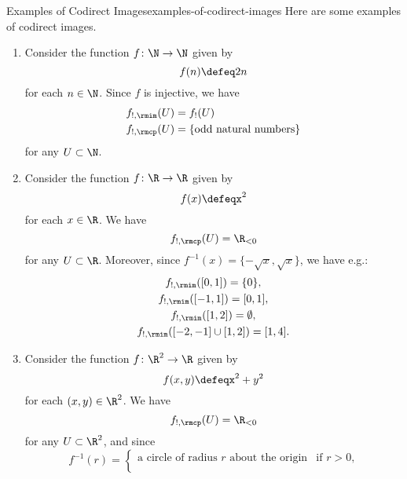 \begin{example}{Examples of Codirect Images}{examples-of-codirect-images}%
    Here are some examples of codirect images.
    \begin{enumerate}
        \item\label{examples-of-codirect-images-multiplication-by-two}Consider the function $f\colon\N\to\N$ given by
            \[
                f(n)
                \defeq
                2n
            \]%
            for each $n\in\N$. Since $f$ is injective, we have
            \begin{align*}
                f_{!,\rmim}(U) &= f_{!}(U)\\
                f_{!,\rmcp}(U) &= \{\text{odd natural numbers}\}
            \end{align*}
            for any $U\subset\N$.
        \item\label{examples-of-codirect-images-parabolas}Consider the function $f\colon\R\to\R$ given by
            \[
                f(x)%
                \defeq%
                x^{2}
            \]%
            for each $x\in\R$. We have
            \[
                f_{!,\rmcp}(U)%
                =%
                \R_{<0}
            \]%
            for any $U\subset\R$. Moreover, since $f^{-1}(x)=\{-\sqrt{x},\sqrt{x}\}$, we have e.g.:
            \begin{gather*}
                f_{!,\rmim}([0,1])            = \{0\},\\
                f_{!,\rmim}([-1,1])           = [0,1],\\
                f_{!,\rmim}([1,2])            = \emptyset,\\
                f_{!,\rmim}([-2,-1]\cup[1,2]) = [1,4].
            \end{gather*}
        \item\label{examples-of-codirect-images-circles}Consider the function $f\colon\R^{2}\to\R$ given by
            \[
                f(x,y)%
                \defeq%
                x^{2}+y^{2}
            \]%
            for each $(x,y)\in\R^{2}$. We have
            \[
                f_{!,\rmcp}(U)%
                =%
                \R_{<0}
            \]%
            for any $U\subset\R^{2}$, and since
            \[
                f^{-1}(r)%
                =
                \begin{cases}
                    \text{a circle of radius $r$ about the origin} &\text{if $r>0$,}\\

\end{cases}\]
\end{enumerate}
\end{example}
